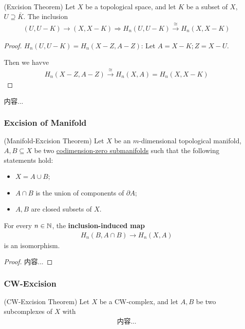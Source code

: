 \documentclass[Total.tex]{subfiles}
\begin{document}
				\begin{theorem}
					(Excision Theorem)  Let $X$ be a topological space, and let $K$ be a subset of $X$, $U\supseteq \bar{K}$. The inclusion
					\begin{gather*}
						(U,U-K)\rightarrow (X,X-K)\Rightarrow H_n(U,U-K)\stackrel{\cong}{\rightarrow} H_n(X,X-K)
					\end{gather*}
				\end{theorem}
				\begin{proof}
					$H_n(U,U-K)=H_n(X-Z,A-Z)$: Let $A=X-K;Z=X-U$.
					
					Then we havve
					\begin{gather*}
						H_n(X-Z,A-Z)\stackrel{\cong}{\rightarrow} H_n(X,A)=H_n(X,X-K)
					\end{gather*}
				\end{proof}
				\begin{example}
					内容...
				\end{example}
				\subsubsection{Excision of Manifold}
				\begin{theorem}
					(Manifold-Excision Theorem) Let $X$ be an $m$-dimensional topological manifold, $A,B\subseteq X$ be two \underline{codimension-zero submanifolds} such that the following statements hold:
					\begin{itemize}
						\item $X=A\cup B$;
						\item $A\cap B$ is the union of components of $\partial A$; 
						\item $A,B$ are closed subsets of $X$.
					\end{itemize}
					For every $n\in \mathbb{N}$, the \textbf{inclusion-induced map}
					\begin{gather*}
						H_n(B,A\cap B)\rightarrow H_n(X,A)
					\end{gather*}
					is an isomorphism.
				\end{theorem}
				\begin{proof}
					内容...
				\end{proof}
				\subsubsection{CW-Excision}
				\begin{theorem}
					(CW-Excision Theorem) Let $X$ be a CW-complex, and let $A,B$ be two subcomplexes of $X$ with
					\begin{gather*}
						内容...
					\end{gather*}
				\end{theorem}
\end{document}
